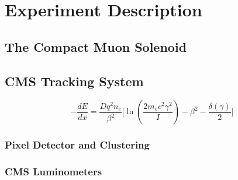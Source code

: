 \chapter{Experiment Description }

 

\section{The Compact Muon Solenoid}



\section{CMS Tracking System}


\begin{equation}
  -\frac{dE}{dx}= \frac{Dq^{2}n_{e}}{\beta ^{2}} \biggl[ \ln \left(\frac{2m_{e}c^{2}\gamma^{2}}{I} \right) -\beta^{2} -\frac{\delta(\gamma)}{2}  \biggr]
  \label{bethe}
\end{equation}

 

\subsection{Pixel Detector and Clustering}
\label{pixel_clust_reco}

\subsection{CMS Luminometers}

